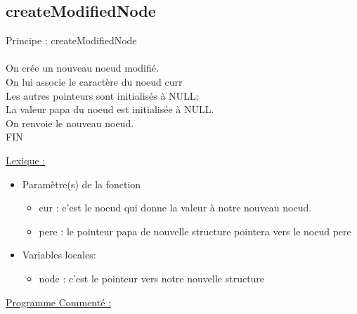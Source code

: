 \documentclass[a4paper]{article}
\newcommand\tab[1][1cm]{\hspace*{#1}}
\begin{document}


\subsection{createModifiedNode}
\begin{algorithm}
Principe : createModifiedNode
\\
\\
\tab On crée un nouveau noeud modifié.
\\
\tab On lui associe le caractère du noeud curr
\\
\tab Les autres pointeurs sont initialisés à NULL;
\\
\tab La valeur papa du noeud est initialisée à NULL.
\\
\tab On renvoie le nouveau noeud.
\\
FIN
\end{algorithm}
\underline{Lexique :}
\begin{itemize}
\item Paramètre(s) de la fonction  
\begin{itemize}
\item cur : c'est le noeud qui donne la valeur à notre nouveau noeud.
\item pere : le pointeur papa de nouvelle structure pointera vers le noeud pere
\end{itemize}
\item Variables locales:
\begin{itemize}
\item node : c'est le pointeur vers notre nouvelle structure
\end{itemize}
\end{itemize}
\underline{Programme Commenté :}


\newpage
\end{document}
